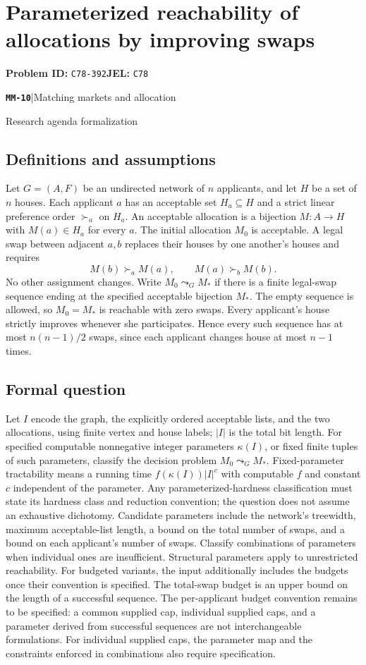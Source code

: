\documentclass[11pt,a4paper]{article}
\newcommand{\entrymeta}[3]{{\sffamily\small\color{muted}\textbf{\texttt{#1}}\quad|\quad #2\par #3\par}}
\begin{document}
\section*{Parameterized reachability of allocations by improving swaps}
\textbf{Problem ID:} \texttt{C78-392}\quad \textbf{JEL:} \texttt{C78}\par
\label{problem:OP-0551}
\label{beyond:MM-10}
\entrymeta{MM-10}{Matching markets and allocation}{Research agenda formalization}
\subsection*{Definitions and assumptions}
Let $G=(A,F)$ be an undirected network of $n$ applicants, and let $H$ be a set of $n$ houses. Each applicant $a$ has an acceptable set $H_a\subseteq H$ and a strict linear preference order $\succ_a$ on $H_a$. An acceptable allocation is a bijection $M:A\to H$ with $M(a)\in H_a$ for every $a$. The initial allocation $M_0$ is acceptable. A legal swap between adjacent $a,b$ replaces their houses by one another's houses and requires
\[
 M(b)\succ_a M(a),\qquad M(a)\succ_b M(b).
\]
No other assignment changes. Write $M_0\leadsto_G M_*$ if there is a finite legal-swap sequence ending at the specified acceptable bijection $M_*$. The empty sequence is allowed, so $M_0=M_*$ is reachable with zero swaps. Every applicant's house strictly improves whenever she participates. Hence every such sequence has at most $n(n-1)/2$ swaps, since each applicant changes house at most $n-1$ times.
\subsection*{Formal question}
Let $I$ encode the graph, the explicitly ordered acceptable lists, and the two allocations, using finite vertex and house labels; $|I|$ is the total bit length. For specified computable nonnegative integer parameters $\kappa(I)$, or fixed finite tuples of such parameters, classify the decision problem $M_0\leadsto_G M_*$. Fixed-parameter tractability means a running time $f(\kappa(I))|I|^c$ with computable $f$ and constant $c$ independent of the parameter. Any parameterized-hardness classification must state its hardness class and reduction convention; the question does not assume an exhaustive dichotomy. Candidate parameters include the network's treewidth, maximum acceptable-list length, a bound on the total number of swaps, and a bound on each applicant's number of swaps. Classify combinations of parameters when individual ones are insufficient. Structural parameters apply to unrestricted reachability. For budgeted variants, the input additionally includes the budgets once their convention is specified. The total-swap budget is an upper bound on the length of a successful sequence. The per-applicant budget convention remains to be specified: a common supplied cap, individual supplied caps, and a parameter derived from successful sequences are not interchangeable formulations. For individual supplied caps, the parameter map and the constraints enforced in combinations also require specification.
\end{document}
